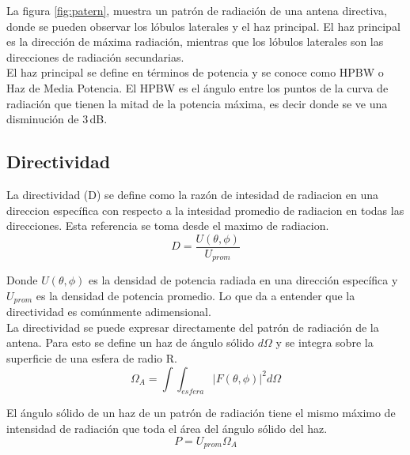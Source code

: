 La figura \ref{fig:patern}, muestra un patrón de radiación de una antena directiva, donde se pueden observar los lóbulos laterales y el haz principal. El haz principal es la dirección de máxima radiación, mientras que los lóbulos laterales son las direcciones de radiación secundarias.\\

El haz principal se define en términos de potencia y se conoce como HPBW o Haz de Media Potencia. El HPBW es el ángulo entre los puntos de la curva de radiación que tienen la mitad de la potencia máxima, es decir donde se ve una disminución de 3 dB.\\

\subsection{Directividad}

La directividad (D) se define como la razón de intesidad de radiacion en una direccion específica con respecto a la intesidad promedio de radiacion en todas las direcciones. Esta referencia se toma desde el maximo de radiacion.\\

\begin{equation}\label{eq:directivity}
    D = \frac{U(\theta, \phi)}{U_{prom}}
\end{equation}

Donde $U(\theta, \phi)$ es la densidad de potencia radiada en una dirección específica y $U_{prom}$ es la densidad de potencia promedio. Lo que da a entender que la directividad es comúnmente adimensional.\\

La directividad se puede expresar directamente del patrón de radiación de la antena. Para esto se define un haz de ángulo sólido $d\Omega$  y se integra sobre la superficie de una esfera de radio R.\\

\begin{equation}\label{eq:solidangle}
    \Omega_{A} = \int\int_{esfera} |F(\theta, \phi)|^{2} d\Omega
\end{equation}

El ángulo sólido de un haz de un patrón de radiación tiene el mismo máximo de intensidad de radiación que toda el área del ángulo sólido del haz.\\

\begin{equation}\label{eq:powerdensity}
    P = U_{prom} \Omega_{A}
\end{equation}

